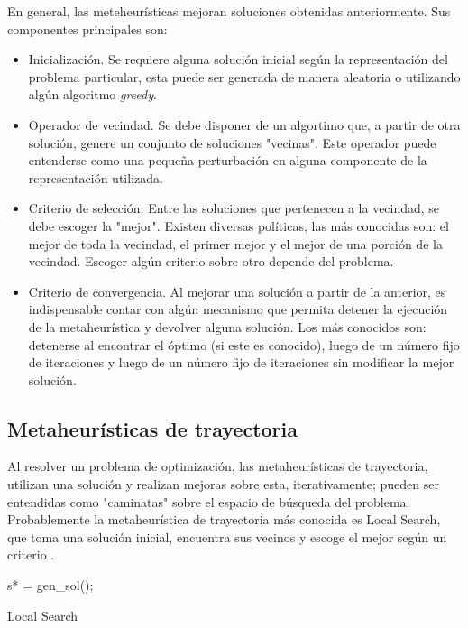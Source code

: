 \documentclass{ci5652}
\begin{document}
En general, las meteheurísticas mejoran soluciones obtenidas anteriormente. Sus
componentes principales son:

\begin{itemize}
  \item Inicialización. Se requiere alguna solución inicial según la
  representación del problema particular, esta puede ser generada de manera
  aleatoria o utilizando algún algoritmo \textit{greedy}.
  \item Operador de vecindad. Se debe disponer de un algortimo que, a partir de
  otra solución, genere un conjunto de soluciones "vecinas". Este operador puede
  entenderse como una pequeña perturbación en alguna componente de la
  representación utilizada.
  \item Criterio de selección. Entre las soluciones que pertenecen a la
  vecindad, se debe escoger la "mejor". Existen diversas políticas, las más
  conocidas son: el mejor de toda la vecindad, el primer mejor y el mejor de una
  porción de la vecindad. Escoger algún criterio sobre otro depende del
  problema.
  \item Criterio de convergencia. Al mejorar una solución a partir de la
  anterior, es indispensable contar con algún mecanismo que permita detener la
  ejecución de la metaheurística y devolver alguna solución. Los más conocidos
  son: detenerse al encontrar el óptimo (si este es conocido), luego de un
  número fijo de iteraciones y luego de un número fijo de iteraciones sin
  modificar la mejor solución.

\end{itemize}


\subsection{Metaheurísticas de trayectoria}

Al resolver un problema de optimización, las metaheurísticas de trayectoria,
utilizan una solución y realizan mejoras sobre esta, iterativamente; pueden ser
entendidas como "caminatas" sobre el espacio de búsqueda del problema.
Probablemente la metaheurística de trayectoria más conocida es
Local Search, que toma una solución inicial, encuentra sus vecinos y
escoge el mejor según un criterio \cite{Talbi_2009}.

\begin{algorithm}
 \DontPrintSemicolon
 \vspace*{0.1cm}
  s* = gen\_sol();\;
 \vspace*{0.1cm}
 \caption{Local Search}
\end{algorithm}
\end{document}
